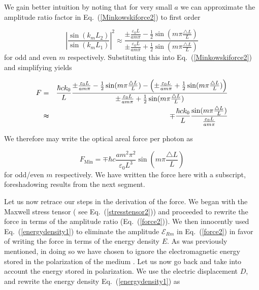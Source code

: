 \documentclass[twocolumn,english,pra,aps,superscriptaddress,floatfix]{revtex4-1}
\begin{document}
We gain better intuition by noting that for very small $a$ we can approximate the amplitude ratio factor in Eq.\ (\ref{Minkowskiforce2}) to first order 

\begin{equation}
\left|\frac{\sin(k_{m}L_{2})}{\sin(k_{m}L_{1})}\right|^{2}\approx\frac{\pm\frac{\varepsilon_{0}L}{a m\pi}-\frac{1}{2}\sin(m\pi\frac{\triangle L}{L})}{\pm\frac{\varepsilon_{0}L}{a m\pi}+\frac{1}{2}\sin(m\pi\frac{\triangle L}{L})}
\label{amplitudeapproximation}
\end{equation}
for odd and even $m$ respectively. Substituting this into Eq.\ (\ref{Minkowskiforce2}) and simplifying yields

\begin{eqnarray}
F&=&\frac{\hbar ck_0}{L}\frac{\pm\frac{\varepsilon_{0}L}{a m\pi}-\frac{1}{2}\sin(m\pi\frac{\triangle L}{L})-\left(\pm\frac{\varepsilon_{0}L}{a m\pi}+\frac{1}{2}\sin(m\pi\frac{\triangle L}{L})\right)}{\pm\frac{\varepsilon_{0}L}{a m\pi}+\frac{1}{2}\sin(m\pi\frac{\triangle L}{L})} \nonumber \\
&\thickapprox &\mp\frac{\hbar ck_0}{L}\frac{\sin(m\pi\frac{\triangle L}{L})}{\frac{\varepsilon_{0}L}{a m\pi}}
\label{Minkowskiforce3}
\end{eqnarray}

We therefore may write the optical areal force per photon as 

\begin{equation}
F_{\mathrm{Min}}=\mp\hbar c\frac{a m^{2}\pi^{2}}{\varepsilon_{0}L^{3}}\sin(m\pi\frac{\triangle L}{L})
\label{Minkowskiforce4}
\end{equation}
for odd/even $m$ respectively.  We have written the force here with a subscript, foreshadowing results from the next segment.

Let us now retrace our steps in the derivation of the force.  We began with the Maxwell stress tensor ( see Eq.\ (\ref{stresstensor2})) and proceeded to rewrite the force in terms of the amplitude ratio (Eq.\ (\ref{force2})).  We then innocently used Eq.\ (\ref{energydensity1}) to eliminate the amplitude $\mathcal{E}_{Rm}$ in Eq.\ (\ref{force2}) in favor of writing the force in terms of the energy density $E$. As was previously mentioned, in doing so we have chosen to ignore the electromagnetic energy stored in the polarization of the medium \cite{griffiths}. Let us now go back and take into account the energy stored in polarization. We use the electric displacement $D$, and rewrite the energy density Eq.\ (\ref{energydensity1}) as \cite{griffiths}
\end{document}
